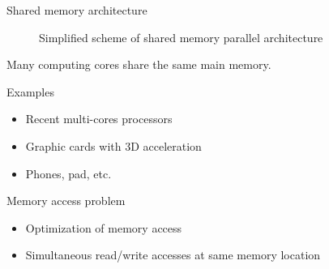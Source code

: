 \documentclass[compress,10pt,aspectratio=169]{beamer}
\begin{document}
\begin{frame}[fragile]{Shared memory architecture}
  \scriptsize

 \begin{multicols}{2}
  \begin{figure}[ht]
    \caption{\scriptsize Simplified scheme of shared memory parallel architecture}
  \end{figure}

  Many computing cores share the same main memory.
  
  \begin{exampleblock}{Examples}
    \begin{itemize}
    \item Recent multi-cores processors
    \item Graphic cards with 3D acceleration
    \item Phones, pad, etc.
    \end{itemize}
  \end{exampleblock}

  \begin{alertblock}{Memory access problem}
    \begin{itemize}
    \item Optimization of memory access
    \item Simultaneous read/write accesses at same memory location
    \end{itemize}
  \end{alertblock}
  
  \end{multicols}
\end{frame}
\end{document}

